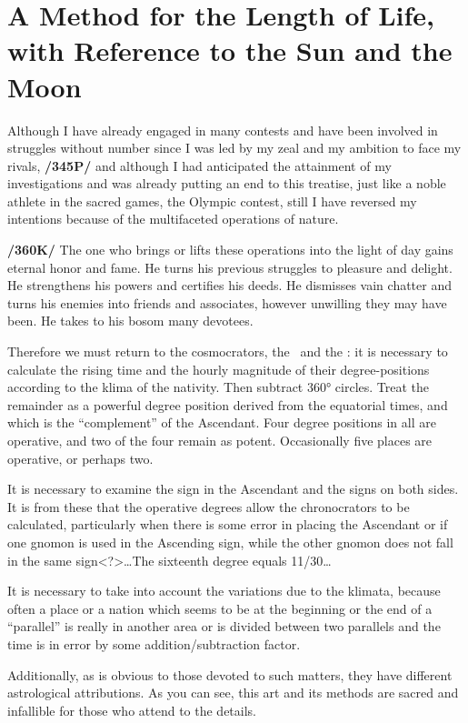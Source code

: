\section{A Method for the Length of Life, with Reference to the Sun and the Moon}

Although I have already engaged in many contests and have been involved in struggles without number since I was led by my zeal and my ambition to face my rivals, \textbf{/345P/} and although I had
anticipated the attainment of my investigations and was already putting an end to this treatise, just like a noble athlete in the sacred games, the Olympic contest, still I have reversed my intentions because of the
multifaceted operations of nature. 

\textbf{/360K/} The one who brings or lifts these operations into the light of day gains eternal honor and fame. He turns his previous struggles to pleasure and delight. He strengthens his powers and certifies his deeds. He dismisses vain chatter and turns his enemies into friends and associates, however unwilling they may have been. He takes to his bosom many devotees.

Therefore we must return to the cosmocrators, the \Sun\, and the \Moon: it is necessary to calculate the rising time and the hourly magnitude of their degree-positions according to the klima of the nativity. Then subtract 360° circles. Treat the remainder as a powerful degree position derived from the equatorial times, and which is the “complement” of the Ascendant. Four degree positions in all are operative, and two of
the four remain as potent. Occasionally five places are operative, or perhaps two.

It is necessary to examine the sign in the Ascendant and the signs on both sides. It is from these that the operative degrees allow the chronocrators to be calculated, particularly when there is some error in
placing the Ascendant or if one gnomon is used in the Ascending sign, while the other gnomon does not fall in the same sign<?>…The sixteenth degree equals 11/30…

It is necessary to take into account the variations due to the klimata, because often a place or a nation which seems to be at the beginning or the end of a “parallel” is really in another area or is divided between
two parallels and the time is in error by some addition/subtraction factor. 

Additionally, as is obvious to those devoted to such matters, they have different astrological attributions. As you can see, this art and its methods are sacred and infallible for those who attend to the details.

\newpage